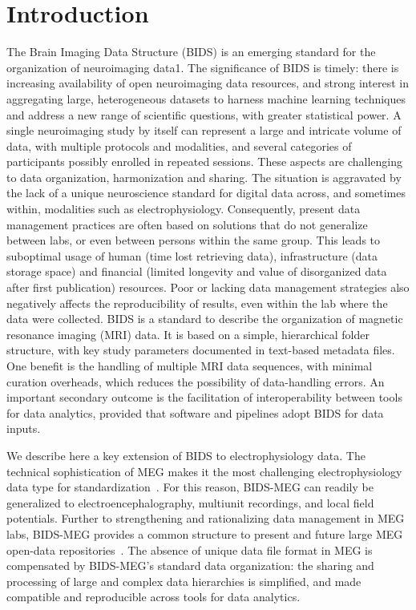 \section{Introduction}
\label{sec:bids_intro}
The Brain Imaging Data Structure (BIDS) is an emerging standard for the organization of neuroimaging data1. The significance of BIDS is timely: there is increasing availability of open neuroimaging data resources, and strong interest in aggregating large, heterogeneous datasets to harness machine learning techniques and address a new range of scientific questions, with greater statistical power. A single neuroimaging study by itself can represent a large and intricate volume of data, with multiple protocols and modalities, and several categories of participants possibly enrolled in repeated sessions. These aspects are challenging to data organization, harmonization and sharing. The situation is aggravated by the lack of a unique neuroscience standard for digital data across, and sometimes within, modalities such as electrophysiology. Consequently, present data management practices are often based on solutions that do not generalize between labs, or even between persons within the same group. This leads to suboptimal usage of human (time lost retrieving data), infrastructure (data storage space) and financial (limited longevity and value of disorganized data after first publication) resources. Poor or lacking data management strategies also negatively affects the reproducibility of results, even within the lab where the data were collected. 
BIDS is a standard to describe the organization of magnetic resonance imaging (MRI) data. It is based on a simple, hierarchical folder structure, with key study parameters documented in text-based metadata files. One benefit is the handling of multiple MRI data sequences, with minimal curation overheads, which reduces the possibility of data-handling errors. An important secondary outcome is the facilitation of interoperability between tools for data analytics, provided that software and pipelines adopt BIDS for data inputs. 

We describe here a key extension of BIDS to electrophysiology data. The technical sophistication of MEG makes it the most challenging electrophysiology data type for standardization~\citep{baillet2017magnetoencephalography}. For this reason, BIDS-MEG can readily be generalized to electroencephalography, multiunit recordings, and local field potentials. Further to strengthening and rationalizing data management in MEG labs, BIDS-MEG provides a common structure to present and future large MEG open-data repositories~\citep{larson2013adding, taylor2015cambridge, niso2016omega}. The absence of unique data file format in MEG is compensated by BIDS-MEG’s standard data organization: the sharing and processing of large and complex data hierarchies is simplified, and made compatible and reproducible across tools for data analytics. 


